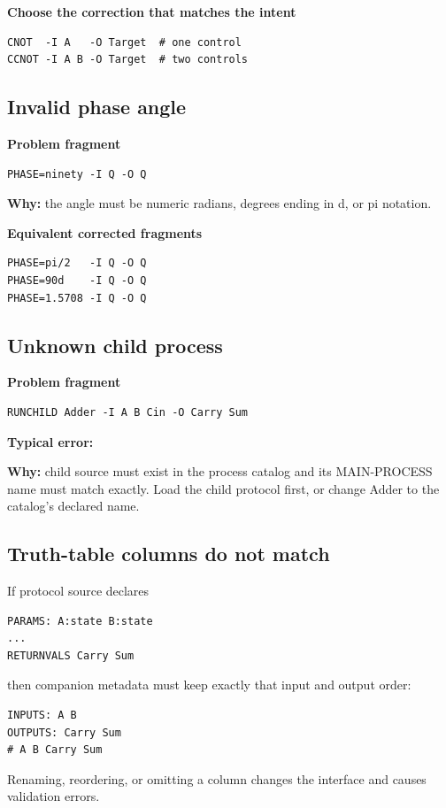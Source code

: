 \textbf{Choose the correction that matches the intent}
\begin{lstlisting}
CNOT  -I A   -O Target  # one control
CCNOT -I A B -O Target  # two controls
\end{lstlisting}

\subsection{Invalid phase angle}

\textbf{Problem fragment}
\begin{lstlisting}
PHASE=ninety -I Q -O Q
\end{lstlisting}

\textbf{Why:} the angle must be numeric radians, degrees ending in d, or pi
notation.

\textbf{Equivalent corrected fragments}
\begin{lstlisting}
PHASE=pi/2   -I Q -O Q
PHASE=90d    -I Q -O Q
PHASE=1.5708 -I Q -O Q
\end{lstlisting}

\subsection{Unknown child process}

\textbf{Problem fragment}
\begin{lstlisting}
RUNCHILD Adder -I A B Cin -O Carry Sum
\end{lstlisting}

\textbf{Typical error:} 

\textbf{Why:} child source must exist in the process catalog and its
MAIN-PROCESS name must match exactly. Load the child protocol first, or change
Adder to the catalog's declared name.

\subsection{Truth-table columns do not match}

If protocol source declares
\begin{lstlisting}
PARAMS: A:state B:state
...
RETURNVALS Carry Sum
\end{lstlisting}
then companion metadata must keep exactly that input and output order:
\begin{lstlisting}
INPUTS: A B
OUTPUTS: Carry Sum
# A B Carry Sum
\end{lstlisting}
Renaming, reordering, or omitting a column changes the interface and causes
validation errors.


